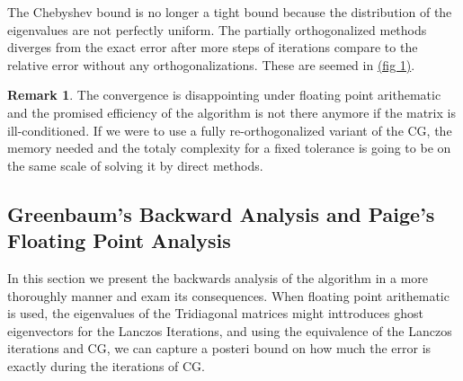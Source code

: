 \documentclass[]{article}
\theoremstyle{definition}
\newtheorem{remark}{Remark}[subsection]
\begin{document}
        The Chebyshev bound is no longer a tight bound because the distribution of the eigenvalues are not perfectly uniform. The partially orthogonalized methods diverges from the exact error after more steps of iterations compare to the relative error without any orthogonalizations. These are seemed in \hyperref[fig:1]{(fig 1)}. 
        \begin{remark}
            The convergence is disappointing under floating point arithematic and the promised efficiency of the algorithm is not there anymore if the matrix is ill-conditioned. If we were to use a fully re-orthogonalized variant of the CG, the memory needed and the totaly complexity for a fixed tolerance is going to be on the same scale of solving it by direct methods. 
        \end{remark}
    \subsection{Greenbaum's Backward Analysis and Paige's Floating Point Analysis}
        In this section we present the backwards analysis of the algorithm in a more thoroughly manner and exam its consequences. When floating point arithematic is used, the eigenvalues of the Tridiagonal matrices might inttroduces ghost eigenvectors for the Lanczos Iterations, and using the equivalence of the Lanczos iterations and CG, we can capture a posteri bound on how much the error is exactly during the iterations of CG. 
\end{document}
